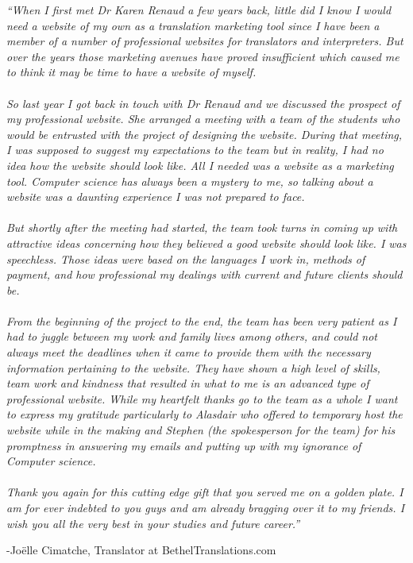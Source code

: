 \documentclass{l3proj}
\begin{document}
\textit{``When I first met Dr Karen Renaud a few years back, little did I know I
would need a website of my own as a translation marketing tool since I have been
a member of a number of professional websites for translators and interpreters.
But over the years those marketing avenues have proved insufficient which caused
me to think it may be time to have a website of myself.\\
\\
So last year I got back in touch with Dr Renaud and we discussed the prospect of
my professional website. She arranged a meeting with a team of the students who
would be entrusted with the project of designing the website.
During that meeting, I was supposed to suggest my expectations to the team but
in reality, I had no idea how the website should look like. All I needed was a
website as a marketing tool. Computer science has always been a mystery to me,
so talking about a website was a daunting experience I was not prepared to
face.\\
\\
But shortly after the meeting had started, the team took turns in coming up with
attractive ideas concerning how they believed a good website should look like. I
was speechless. Those ideas were based on the languages I work in, methods of
payment, and how professional my dealings with current and future clients should
be.\\
\\
From the beginning of the project to the end, the team has been very patient as
I had to juggle between my work and family lives among others, and could not
always meet the deadlines when it came to provide them with the necessary
information pertaining to the website.
They have shown a high level of skills, team work and kindness that resulted in
what to me is an advanced type of professional website.
While my heartfelt thanks go to the team as a whole I want to express my
gratitude particularly to Alasdair who offered to temporary host the website
while in the making and Stephen (the spokesperson for the team) for his
promptness in answering my emails and putting up with my ignorance of Computer
science.\\
\\
Thank you again for this cutting edge gift that you served me on a golden plate.
I am for ever indebted to you guys and am already bragging over it to my
friends. I wish you all the very best in your studies and future career.''}
\begin{flushright}
-Joëlle Cimatche, Translator at BethelTranslations.com
\end{flushright}
\newpage
\end{document}
